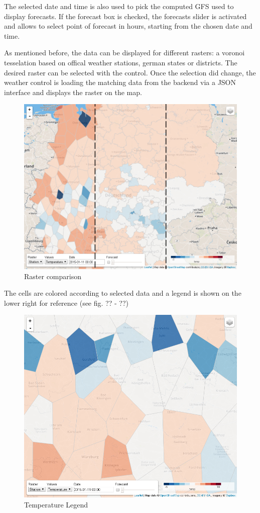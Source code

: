 The selected date and time is also used to pick the computed GFS used to
display forecasts. If the forecast box is checked, the forecasts slider
is activated and allows to select point of forecast in hours, starting
from the chosen date and time.

As mentioned before, the data can be displayed for different rasters: a
voronoi tesselation based on offical weather stations, german states or
districts. The desired raster can be selected with the control. Once the
selection did change, the weather control is loading the matching data
from the backend via a JSON interface and displays the raster on the
map.

\begin{figure}[htbp]
\centering
\includegraphics{pictures/screenshot-raster.png}
\caption{Raster comparison}
\end{figure}

The cells are colored according to selected data and a legend is shown
on the lower right for reference (see fig. ?? - ??)

\begin{figure}[htbp]
\centering
\includegraphics{pictures/screenshot-legend-temp.png}
\caption{Temperature Legend}
\end{figure}

